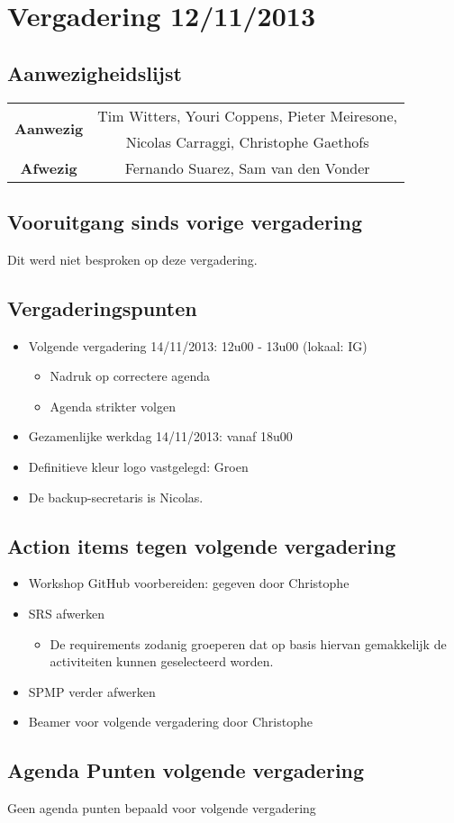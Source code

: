 \section{Vergadering 12/11/2013}

\subsection{Aanwezigheidslijst}
\begin{table}[htbp]
	\centering
	\begin{tabular}{c|c}
		\multirow{2}{*}{\textbf{Aanwezig}} & Tim Witters, Youri Coppens, Pieter Meiresone, \\
		& Nicolas Carraggi,  Christophe Gaethofs \\
		\hline
		\textbf{Afwezig} &  Fernando Suarez, Sam van den Vonder \\
	\end{tabular}
\end{table}

\subsection{Vooruitgang sinds vorige vergadering}
Dit werd niet besproken op deze vergadering.

\subsection{Vergaderingspunten}
\begin{itemize}
	\item 
		Volgende vergadering 14/11/2013: 12u00 - 13u00 (lokaal: IG)
		\begin{itemize}
			\item Nadruk op correctere agenda
			\item Agenda strikter volgen
		\end{itemize}
	\item Gezamenlijke werkdag 14/11/2013: vanaf 18u00
	\item Definitieve kleur logo vastgelegd: Groen
	\item De backup-secretaris is Nicolas.
\end{itemize}

\subsection{Action items tegen volgende vergadering}
\begin{itemize}
	\item 
		Workshop GitHub voorbereiden: gegeven door Christophe
	\item 
		SRS afwerken
		\begin{itemize}
			\item De requirements zodanig groeperen dat op basis hiervan gemakkelijk de activiteiten kunnen geselecteerd worden.
		\end{itemize}
	\item 
		SPMP verder afwerken
	\item
		Beamer voor volgende vergadering door Christophe
		
\end{itemize}

\subsection{Agenda Punten volgende vergadering}
Geen agenda punten bepaald voor volgende vergadering

